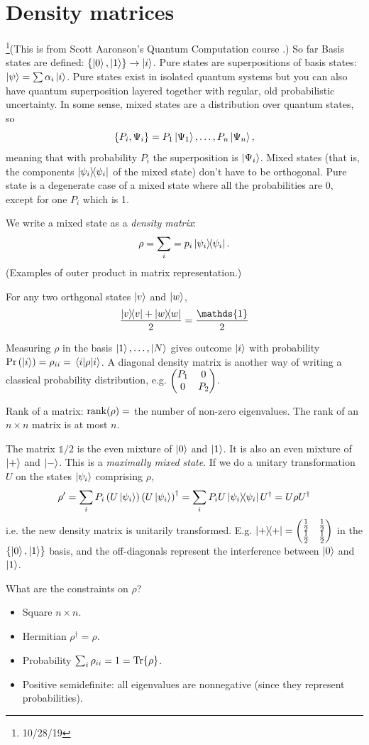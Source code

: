 \documentclass[12pt]{article}
\newcommand*\id{\mathds{1}}
\begin{document}
\section{Density matrices}
\footnote{10/28/19}(This is from Scott Aaronson's Quantum Computation course \cite[Lec. 6]{scaaronson}.) So far Basis
states are defined: $\{\ket{0}, \ket{1}\} \rightarrow \ket{i}$. Pure states are
superpositions of basis states: $\ket{\psi} = \sum\alpha_i \ket{i}$. Pure
states exist in isolated quantum systems but you can also have quantum
superposition layered together with regular, old probabilistic uncertainty. In
some sense, mixed states are a distribution over quantum states, so
\[\{P_i, \Psi_i\} = P_1\ket{\Psi_1}, \ldots, P_n\ket{\Psi_n},\]
meaning that with probability $P_i$ the superposition is $\ket{\Psi_i}$. Mixed
states (that is, the components $\ketbra{\psi_i}$ of the mixed state) don't
have to be orthogonal. Pure state is a degenerate case of a mixed state where
all the probabilities are 0, except for one $P_i$ which is 1.

We write a mixed state as a \emph{density matrix}:
\[\rho = \sum_i = p_i\ketbra{\psi_i}.\]
(Examples of outer product in matrix representation.)

For any two orthgonal states $\ket{v}$ and $\ket{w}$,
\[\frac{\ketbra{v} + \ketbra{w}}{2}  = \frac{\id}{2}\]

Measuring $\rho$ in the basis $\ket{1}, \ldots, \ket{N}$ gives outcome
$\ket{i}$ with probability $\Pr\left(\ket{i}\right) = \rho_{ii} =
\ev{\rho}{i}$. A diagonal density matrix is another way of writing a classical
probability distribution, e.g. $\pmqty{\dmat[0]{P_1,P_2}}$.

Rank of a matrix: $\rank(\rho) =$ the number of non-zero eigenvalues. The rank
of an $n\times n$ matrix is at most $n$.

The matrix $\id/2$ is the even mixture of $\ket{0}$ and $\ket{1}$. It is also
an even mixture of $\ket{+}$ and $\ket{-}$. This is a \emph{maximally mixed
state}. If we do a unitary transformation $U$ on the states $\ket{\psi_i}$
comprising $\rho$,
\[\rho' = \sum_i P_i \left(U\ket{\psi_i}\right)\left(U\ket{\psi_i}\right)^\dag
= \sum_i P_i U\ketbra{\psi_i}U^\dag = U\rho U^\dag\]
i.e. the new density matrix is unitarily transformed. E.g. $\ketbra{+} =
\pmqty{\xmat{\frac{1}{2}}{2}{2}}$ in the $\{\ket{0}, \ket{1}\}$ basis, and the
off-diagonals represent the
interference between $\ket{0}$ and $\ket{1}$.

What are the constraints on $\rho$?
\begin{itemize}
    \item Square $n\times n$.
    \item Hermitian $\rho^\dag = \rho$.
    \item Probability $\sum_i \rho_{ii} = 1 = \Tr{\rho}$.
    \item Positive semidefinite: all eigenvalues are nonnegative (since they
        represent probabilities).
\end{itemize}
\end{document}
